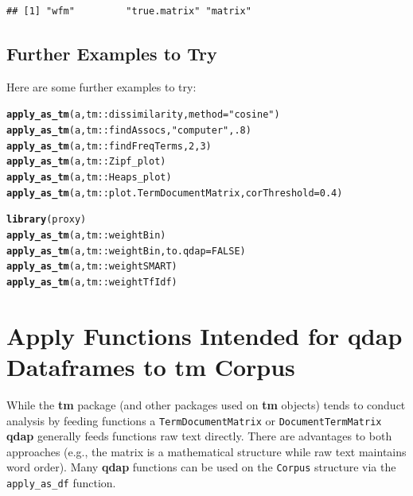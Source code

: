 \documentclass{article}\usepackage[]{graphicx}\usepackage[]{color}
\makeatletter
\newcommand{\hlnum}[1]{\textcolor[rgb]{0.686,0.059,0.569}{#1}}%
\newcommand{\hlstr}[1]{\textcolor[rgb]{0.192,0.494,0.8}{#1}}%
\newcommand{\hlstd}[1]{\textcolor[rgb]{0.345,0.345,0.345}{#1}}%
\newcommand{\hlkwc}[1]{\textcolor[rgb]{0.333,0.667,0.333}{#1}}%
\newcommand{\hlkwd}[1]{\textcolor[rgb]{0.737,0.353,0.396}{\textbf{#1}}}%
\newenvironment{kframe}{%
 \def\at@end@of@kframe{}%
 \ifinner\ifhmode%
  \def\at@end@of@kframe{\end{minipage}}%
  \begin{minipage}{\columnwidth}%
 \fi\fi%
 \def\FrameCommand##1{\hskip\@totalleftmargin \hskip-\fboxsep
 \colorbox{shadecolor}{##1}\hskip-\fboxsep
     \hskip-\linewidth \hskip-\@totalleftmargin \hskip\columnwidth}%
 \MakeFramed {\advance\hsize-\width
   \@totalleftmargin\z@ \linewidth\hsize
   \@setminipage}}%
 {\par\unskip\endMakeFramed%
 \at@end@of@kframe}
\newenvironment{knitrout}{}{} %
\makeatother
\begin{document}
\begin{knitrout}
\color{fgcolor}\begin{kframe}
\begin{verbatim}
## [1] "wfm"         "true.matrix" "matrix"
\end{verbatim}
\end{kframe}
\end{knitrout}


\subsection{Further Examples to Try}

Here are some further examples to try:

\begin{knitrout}
\color{fgcolor}\begin{kframe}
\begin{alltt}
\hlkwd{apply_as_tm}\hlstd{(a, tm::dissimilarity,} \hlkwc{method} \hlstd{=} \hlstr{"cosine"}\hlstd{)}
\hlkwd{apply_as_tm}\hlstd{(a, tm::findAssocs,} \hlstr{"computer"}\hlstd{,} \hlnum{.8}\hlstd{)}
\hlkwd{apply_as_tm}\hlstd{(a, tm::findFreqTerms,} \hlnum{2}\hlstd{,} \hlnum{3}\hlstd{)}
\hlkwd{apply_as_tm}\hlstd{(a, tm::Zipf_plot)}
\hlkwd{apply_as_tm}\hlstd{(a, tm::Heaps_plot)}
\hlkwd{apply_as_tm}\hlstd{(a, tm::plot.TermDocumentMatrix,} \hlkwc{corThreshold} \hlstd{=} \hlnum{0.4}\hlstd{)}

\hlkwd{library}\hlstd{(proxy)}
\hlkwd{apply_as_tm}\hlstd{(a, tm::weightBin)}
\hlkwd{apply_as_tm}\hlstd{(a, tm::weightBin,} \hlkwc{to.qdap} \hlstd{=} \hlnum{FALSE}\hlstd{)}
\hlkwd{apply_as_tm}\hlstd{(a, tm::weightSMART)}
\hlkwd{apply_as_tm}\hlstd{(a, tm::weightTfIdf)}
\end{alltt}
\end{kframe}
\end{knitrout}


\section{Apply Functions Intended for qdap Dataframes to tm Corpus}

\hspace{.4cm} While the \textbf{tm} package (and other packages used on \textbf{tm} objects) tends to conduct analysis by feeding functions a \texttt{TermDocumentMatrix} or \texttt{DocumentTermMatrix} \textbf{qdap} generally feeds functions raw text directly.  There are advantages to both approaches (e.g., the matrix is a mathematical structure while raw text maintains word order).  Many \textbf{qdap} functions can be used on the \texttt{Corpus} structure via the \texttt{apply\_as\_df} function.    
\end{document}
